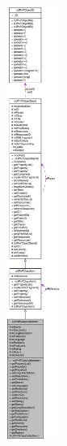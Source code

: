 \begin{figure}[H]
\begin{center}
\leavevmode
\includegraphics[height=400pt]{classcUPnPClassVideoItem__coll__graph}
\end{center}
\end{figure}
